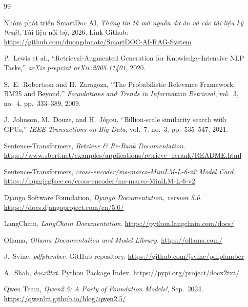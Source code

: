 \documentclass[10pt, conference, a4paper, compsocconf]{IEEEtran}
\newcommand{\smartdoc}{SmartDoc AI}
\begin{document}
\vspace{3.5 em}
\renewcommand{\refname}{Tài liệu tham khảo}
\begin{thebibliography}{99}

  Nhóm phát triển \smartdoc{}, \emph{Thông tin từ mã nguồn dự án và các tài liệu kỹ thuật}, Tài liệu nội bộ, 2026, Link Github: \url{https://github.com/duongdonate/SmartDOC-AI-RAG-System}

  P.~Lewis et al., ``Retrieval-Augmented Generation for Knowledge-Intensive NLP Tasks,'' \emph{arXiv preprint arXiv:2005.11401}, 2020.

  S.~E.~Robertson and H.~Zaragoza, ``The Probabilistic Relevance Framework: BM25 and Beyond,'' \emph{Foundations and Trends in Information Retrieval}, vol.~3, no.~4, pp.~333--389, 2009.

  J.~Johnson, M.~Douze, and H.~J\'egou, ``Billion-scale similarity search with GPUs,'' \emph{IEEE Transactions on Big Data}, vol.~7, no.~3, pp.~535--547, 2021.

  Sentence-Transformers, \emph{Retrieve \& Re-Rank Documentation}. \url{https://www.sbert.net/examples/applications/retrieve_rerank/README.html}

  Sentence-Transformers, \emph{cross-encoder/ms-marco-MiniLM-L-6-v2 Model Card}. \url{https://huggingface.co/cross-encoder/ms-marco-MiniLM-L-6-v2}

  Django Software Foundation, \emph{Django Documentation, version 5.0}. \url{https://docs.djangoproject.com/en/5.0/}

  LangChain, \emph{LangChain Documentation}. \url{https://python.langchain.com/docs/}

  Ollama, \emph{Ollama Documentation and Model Library}. \url{https://ollama.com/}

  J.~Svine, \emph{pdfplumber}. GitHub repository. \url{https://github.com/jsvine/pdfplumber}

  A.~Shah, \emph{docx2txt}. Python Package Index. \url{https://pypi.org/project/docx2txt/}

  Qwen Team, \emph{Qwen2.5: A Party of Foundation Models!}, Sep.~2024. \url{https://qwenlm.github.io/blog/qwen2.5/}

\end{thebibliography}
\end{document}
